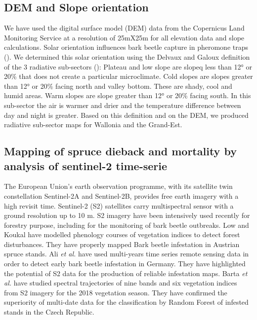 \documentclass[3p,times]{elsarticle}
\begin{document}



\subsection{DEM and Slope orientation}


We have used the digital surface model (DEM) data from the Copernicus Land Monitoring Service \citep{DEM_copernicus}  at a resolution of 25mX25m for all elevation data and slope calculations.
Solar orientation influences bark beetle capture in pheromone traps (\citep{AFR64}). We determined this solar orientation using the Delvaux and Galoux definition of the 3 radiative sub-sectors  (\citep{Delvaux_galoux}):
Plateau and low slope are slopeq less than 12° or 20\% that does not create a particular microclimate. Cold slopes are slopes greater than 12° or 20\% facing north and valley bottom. These are shady, cool and humid areas. Warm slopes are slope greater than 12° or 20\% facing south. In this sub-sector the air is warmer and drier and the temperature difference between day and night is greater. Based on this definition and on the DEM, we produced radiative sub-sector maps for Wallonia and the Grand-Est.

\subsection{Mapping of spruce dieback and mortality by analysis of sentinel-2 time-serie}


The European Union’s earth observation programme, with its satellite twin constellation Sentinel-2A and Sentinel-2B, provides free earth imagery with a high revisit time. 
Sentinel-2 (S2) satellites carry multispectral sensor with a ground resolution up to 10 m. 
S2 imagery have been intensively used recently for forestry purpose, including for the monitoring of bark beetle outbreaks. 
Low and Koukal \citep{low_phenology_2020} have modelled phenology courses of vegetation indices to detect forest disturbances. 
They have properly mapped Bark beetle infestation in Austrian spruce stands.
Ali \textit{et al.} \citep{ali_canopy_2021} have used multi-years time series remote sensing data in order to detect early bark beetle infestation in Germany. 
They have highlighted the potential of S2 data for the production of reliable infestation maps.
Barta \textit{et al.} \citep{barta_early_2021} have studied spectral trajectories of nine bands and six vegetation indices from S2 imagery for the 2018 vegetation season. 
They have confirmed the superiority of multi-date data for the classification by Random Forest of infested stands in the Czech Republic.
\end{document}
